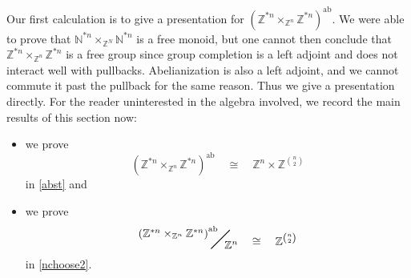 \documentclass{amsbook} %
\newcommand{\bigquotient}[2]{ \raisebox{0.75\height}{$#1$} \mkern-12mu\scalebox{2}{$\diagup$}\mkern-10mu \raisebox{-0.5\height}{$#2$} }
\numberwithin{section}{chapter}
\begin{document}
 Our first calculation is to give a presentation for $(\mathbb{Z}^{\ast n} \times_{\mathbb{Z}^n} \mathbb{Z}^{\ast n})^{\mathrm{ab}}$. We were able to prove that $\mathbb{N}^{\ast n} \times_{\mathbb{Z}^N} \mathbb{N}^{\ast n}$ is a free monoid, but one cannot then conclude that $\mathbb{Z}^{\ast n} \times_{\mathbb{Z}^n} \mathbb{Z}^{\ast n}$ is a free group since group completion is a left adjoint and does not interact well with pullbacks. Abelianization is also a left adjoint, and we cannot commute it past the pullback for the same reason. Thus we give a presentation directly. For the reader uninterested in the algebra involved, we record the main results of this section now:
 \begin{itemize}
 \item we prove
 \[ (\mathbb{Z}^{\ast n} \times_{\mathbb{Z}^n} \mathbb{Z}^{\ast n})^{\mathrm{ab}} \quad \cong \quad \mathbb{Z}^n \times {\mathbb{Z}}^{{n}\choose{2}} \]
 in \cref{abst} and
 \item we prove
 \[ 
			 \bigquotient{{(\mathbb{Z}^{\ast n} \times_{\mathbb{Z}^n} \mathbb{Z}^{\ast n})}^{\mathrm{ab}}}{\mathbb{Z}^n}  \quad \cong\quad \mathbb{Z}^{{n}\choose{2}} 
\]
in \cref{nchoose2}.
 \end{itemize}
\end{document}
